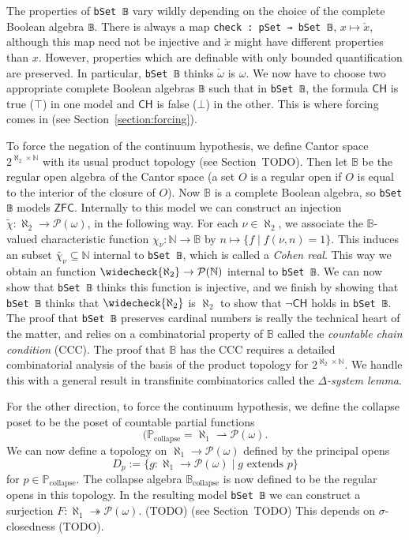 \documentclass[sigplan,10pt,review, anonymous]{acmart}
\newcommand{\B}{\mathbb{B}}
\newcommand{\lil}{\lstinline}
\newcommand{\ZFC}{\mathsf{ZFC}}
\newcommand{\CH}{\mathsf{CH}}
\theoremstyle{definition}
\begin{document}
The properties of \lil{bSet 𝔹} vary wildly depending on the choice of the complete Boolean algebra \lil{𝔹}.
There is always a map \lil{check : pSet → bSet 𝔹}, $x \mapsto \check{x}$, although this map need not be injective and $\check{x}$ might have different properties than $x$. However, properties which are definable with only bounded quantification are preserved. In particular, \lil{bSet 𝔹} thinks $\check{\omega}$ is $\omega$.
We now have to choose two appropriate complete Boolean algebras \lil{𝔹} such that in \lil{bSet 𝔹}, the formula $\CH$ is true ($\top$) in one model and $\CH$ is false ($\bot$) in the other.
This is where forcing comes in (see Section~\ref{section:forcing}).

To force the negation of the continuum hypothesis, we define Cantor space $2^{\aleph_2 \times \mathbb{N}}$ with its usual product topology (see Section~TODO).
Then let $\B$ be the regular open algebra of the Cantor space (a set $O$ is a regular open if $O$ is equal to the interior of the closure of $O$).
Now $\B$ is a complete Boolean algebra, so \lil{bSet 𝔹} models $\ZFC$.
Internally to this model we can construct an injection $\widetilde{\chi} : \aleph_2 \to \mathcal{P}(\omega)$, in the following way.
For each $\nu \in \aleph_2$, we associate the $\B$-valued characteristic function $\chi_\nu : \mathbb{N} \to \B$ by $n \mapsto \{f \mid f(\nu, n) = 1\}$.
This induces an subset $\widetilde{\chi_{\nu}} \subseteq \mathbb{N}$ internal to \lil{bSet 𝔹}, which is called a \emph{Cohen real}.
This way we obtain an function \(\widecheck{\aleph_2} \to \mathcal{P}(\mathbb{N})\) internal to \lil{bSet 𝔹}.
We can now show that \lil{bSet 𝔹} thinks this function is injective, and we finish by showing that \lil{bSet 𝔹} thinks that \(\widecheck{\aleph_2}\) is $\aleph_2$ to show that $\neg\CH$ holds in \lil{bSet 𝔹}.
The proof that \lil{bSet 𝔹} preserves cardinal numbers is really the technical heart of the matter, and relies on a combinatorial property of $\B$ called the \emph{countable chain condition} (CCC).
The proof that $\B$ has the CCC requires a detailed combinatorial analysis of the basis of the product topology for $2^{\aleph_2 \times \mathbb{N}}$.
We handle this with a general result in transfinite combinatorics called the \emph{$\Delta$-system lemma}.

For the other direction, to force the continuum hypothesis, we define the collapse poset to be the poset of countable partial functions
\[(\mathbb{P}_{\text{collapse}} = \aleph_1 \rightharpoonup \mathcal{P}(\omega).\]
We can now define a topology on $\aleph_1 \to \mathcal{P}(\omega)$ defined by the principal opens
\[D_p := \{g : \aleph_1 \to \mathcal{P}(\omega) \mid g \text{ extends } p\} \]
for $p \in \mathbb{P}_{\text{collapse}}$.
The collapse algebra $\mathbb{B}_{\text{collapse}}$ is now defined to be the regular opens in this topology.
In the resulting model \lil{bSet 𝔹} we can construct a surjection \(F : \aleph_1 \twoheadrightarrow \mathcal{P}(\omega)\). (TODO) (see Section~TODO)
This depends on \(\sigma\)-closedness (TODO).
\end{document}
